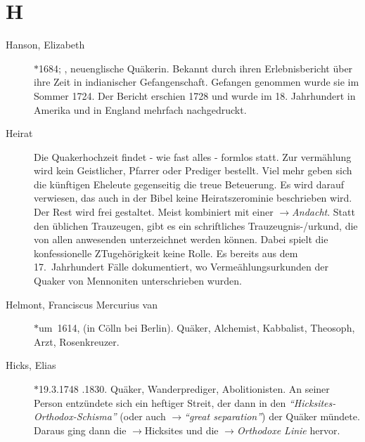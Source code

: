 \section*{H}

\articlesize

\begin{description}

 \item[Hanson, Elizabeth] $\ast$1684; , neuenglische Quäkerin. Bekannt
 durch ihren Erlebnisbericht über ihre Zeit in indianischer Gefangenschaft.
 Gefangen genommen wurde sie im Sommer 1724. Der Bericht erschien 1728 und
 wurde im 18. Jahrhundert in Amerika und in England mehrfach nachgedruckt.


 \item[Heirat] Die Quakerhochzeit findet - wie fast alles - formlos statt. Zur
 vermählung wird kein Geistlicher, Pfarrer oder Prediger bestellt. Viel mehr
 geben sich die künftigen Eheleute gegenseitig die treue Beteuerung. Es wird
 darauf verwiesen, das auch in der Bibel keine Heiratszerominie beschrieben
 wird. Der Rest wird frei gestaltet. Meist kombiniert mit einer
 $\to$\textit{Andacht}. Statt den üblichen Trauzeugen, gibt es ein schriftliches
 Trauzeugnis-/urkund, die von allen anwesenden unterzeichnet werden können.
 Dabei spielt die konfessionelle ZTugehörigkeit keine Rolle. Es bereits aus dem
 17.~Jahrhundert Fälle dokumentiert, wo Vermeählungsurkunden der Quaker von
 Mennoniten unterschrieben wurden.

 \item[Helmont, Franciscus Mercurius van] $\ast$um~1614,  (in Cölln
 bei Berlin). Quäker, Alchemist, Kabbalist, Theosoph, Arzt, Rosenkreuzer.

 \item[Hicks, Elias] $\ast$19.3.1748 .1830. Quäker, Wanderprediger,
 Abolitionisten. An seiner Person entzündete sich ein heftiger Streit, der
 dann in den  \textit{"`Hicksites-Orthodox-Schisma"'} (oder auch
 $\to$\textit{"`great separation"'}) der Quäker mündete.
 Daraus ging dann die $\to$Hicksites und die $\to$\textit{Orthodoxe Linie} hervor.


\end{description}
